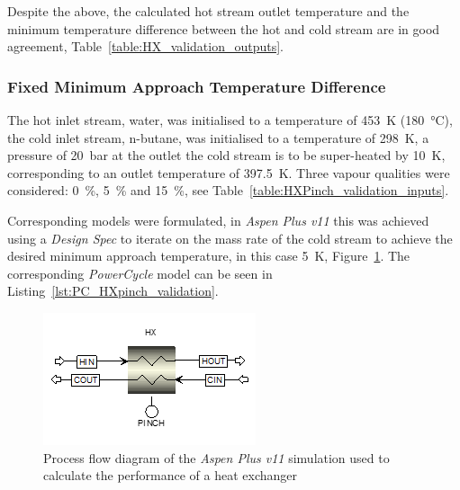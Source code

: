             Despite the above, the calculated hot stream outlet temperature and the minimum temperature difference between the hot and cold stream are in good agreement, Table~\ref{table:HX_validation_outputs}.
            
            \begin{table}[H]
                \caption{The heat exchanger performance calculation results for \emph{Aspen Plus v11} and \emph{PowerCycle} for scenario 1}
                \centering 
                \label{table:HX_validation_outputs}
                
            \end{table}
    
        \subsubsection{Fixed Minimum Approach Temperature Difference}

            The hot inlet stream, water, was initialised to a temperature of \qty{453}{\K} (\qty{180}{\degreeCelsius}), the cold inlet stream, n-butane, was initialised to a temperature of \qty{298}{\K}, a pressure of \qty{20}{\bar} at the outlet the cold stream is to be super-heated by \qty{10}{\K}, corresponding to an outlet temperature of \qty{397.5}{\K}. Three vapour qualities were considered: \qty{0}{\percent}, \qty{5}{\percent} and \qty{15}{\percent}, see Table~\ref{table:HXPinch_validation_inputs}.
    
            \begin{table}[H]
                \caption{The boundary conditions for the heat exchanger performance calculation validation for scenario 2}
                \centering 
                \label{table:HXPinch_validation_inputs}
                
            \end{table}
    
            Corresponding models were formulated, in \emph{Aspen Plus v11} this was achieved using a \emph{Design Spec} to iterate on the mass rate of the cold stream to achieve the desired minimum approach temperature, in this case \qty{5}{\K}, Figure~\ref{fig:Aspen_HXpinch_validation}. The corresponding \emph{PowerCycle} model can be seen in Listing~\ref{lst:PC_HXpinch_validation}.

        \begin{figure}[H]
            \centering
            \includegraphics{Content/PowerCycle/Figures/AspenPLus_HXpinchValidation.png}
            \caption{Process flow diagram of the \emph{Aspen Plus v11} simulation used to calculate the performance of a heat exchanger}
            \label{fig:Aspen_HXpinch_validation}
        \end{figure}

